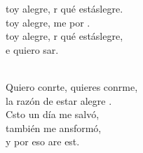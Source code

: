 \begin{cancion}%
	\begin{chorus}%
	toy alegre, r qué estáslegre.\\
	toy alegre, me por . \\
	toy alegre, r qué estáslegre,\\
	e quiero sar.\\
	\end{chorus}%
	\jump\\
	Quiero conrte, quieres conrme,\\
	la razón de estar alegre . \\
\jump
	Csto un día me salvó,\\
	también me ansformó,\\
	y por eso are est.\\
\end{cancion}%
